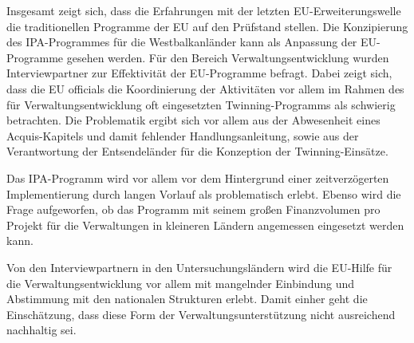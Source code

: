 Insgesamt zeigt sich, dass die Erfahrungen mit der letzten EU-Erweiterungswelle die traditionellen Programme der EU auf den Prüfstand stellen. Die Konzipierung des IPA-Programmes für die Westbalkanländer kann als Anpassung der EU-Programme gesehen werden. Für den Bereich Verwaltungsentwicklung wurden Interviewpartner zur Effektivität der EU-Programme befragt. Dabei zeigt sich, dass die EU officials die Koordinierung der Aktivitäten vor allem im Rahmen des für Verwaltungsentwicklung oft eingesetzten Twinning-Programms als schwierig betrachten. Die Problematik ergibt sich vor allem aus der Abwesenheit eines Acquis-Kapitels und damit fehlender Handlungsanleitung, sowie aus der Verantwortung der Entsendeländer für die Konzeption der Twinning-Einsätze.\par
Das IPA-Programm wird vor allem vor dem Hintergrund einer zeitverzögerten Implementierung durch langen Vorlauf als problematisch erlebt. Ebenso wird die Frage aufgeworfen, ob das Programm mit seinem großen Finanzvolumen pro Projekt für die Verwaltungen in kleineren Ländern angemessen eingesetzt werden kann.\par
Von den Interviewpartnern in den Untersuchungsländern wird die EU-Hilfe für die Verwaltungsentwicklung vor allem mit mangelnder Einbindung und Abstimmung mit den nationalen Strukturen erlebt. Damit einher geht die Einschätzung, dass diese Form der Verwaltungsunterstützung nicht ausreichend nachhaltig sei. 

